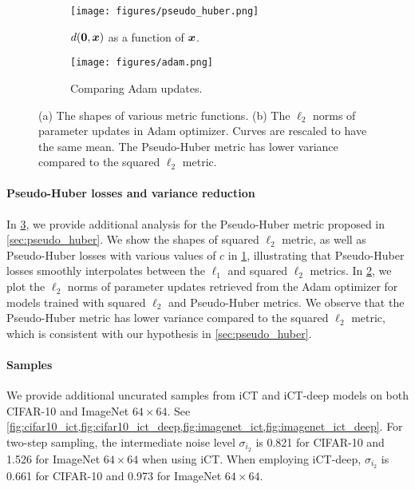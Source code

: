 \begin{figure}
    \centering
    \begin{subfigure}[b]{0.33\textwidth}
        \centering
        \texttt{[image: figures/pseudo\_huber.png]}
        \caption{$d(\bm{0}, {\bm{x}})$ as a function of ${\bm{x}}$.}\label{fig:pseudo_huber_shape}
    \end{subfigure}
    \begin{subfigure}[b]{0.33\textwidth}
        \centering
        \texttt{[image: figures/adam.png]}
        \caption{Comparing Adam updates.}\label{fig:adam}
    \end{subfigure}
    \caption{(a) The shapes of various metric functions. (b) The $\ell_2$ norms of parameter updates in Adam optimizer. Curves are rescaled to have the same mean. The Pseudo-Huber metric has lower variance compared to the squared $\ell_2$ metric.}
    \label{fig:pseudo_huber}
\end{figure}

\paragraph{Pseudo-Huber losses and variance reduction} In \cref{fig:pseudo_huber}, we provide additional analysis for the Pseudo-Huber metric proposed in \cref{sec:pseudo_huber}. We show the shapes of squared $\ell_2$ metric, as well as Pseudo-Huber losses with various values of $c$ in \cref{fig:pseudo_huber_shape}, illustrating that Pseudo-Huber losses smoothly interpolates between the $\ell_1$ and squared $\ell_2$ metrics. In \cref{fig:adam}, we plot the $\ell_2$ norms of parameter updates retrieved from the Adam optimizer for models trained with squared $\ell_2$ and Pseudo-Huber metrics. We observe that the Pseudo-Huber metric has lower variance compared to the squared $\ell_2$ metric, which is consistent with our hypothesis in \cref{sec:pseudo_huber}.

\paragraph{Samples}
We provide additional uncurated samples from iCT and iCT-deep models on both CIFAR-10 and ImageNet $64\times 64$. See \cref{fig:cifar10_ict,fig:cifar10_ict_deep,fig:imagenet_ict,fig:imagenet_ict_deep}. For two-step sampling, the intermediate noise level $\sigma_{i_2}$ is 0.821 for CIFAR-10 and 1.526 for ImageNet $64\times 64$ when using iCT. When employing iCT-deep, $\sigma_{i_2}$ is 0.661 for CIFAR-10 and 0.973 for ImageNet $64\times 64$.

